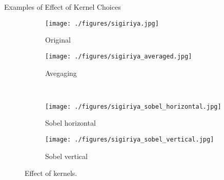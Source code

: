 \begin{frame}{Examples of Effect of Kernel Choices}
    \begin{figure}
        \centering
        \begin{subfigure}[b]{0.35\textwidth}
            \texttt{[image: ./figures/sigiriya.jpg]}
            \caption{Original}
            \label{sfi:sigiriya_original}
        \end{subfigure}
        \hspace{1cm}
        \begin{subfigure}[b]{0.35\textwidth}
            \texttt{[image: ./figures/sigiriya\_averaged.jpg]}
            \caption{Avegaging}
            \label{sfi:sigiriya_averaged}
        \end{subfigure}\\
        \centering
        \begin{subfigure}[b]{0.35\textwidth}
            \texttt{[image: ./figures/sigiriya\_sobel\_horizontal.jpg]}
            \caption{Sobel horizontal}
            \label{sfi:sigiriya_sobel_horizontal}
        \end{subfigure}
        \hspace{1cm}
        \begin{subfigure}[b]{0.35\textwidth}
            \texttt{[image: ./figures/sigiriya\_sobel\_vertical.jpg]}
            \caption{Sobel vertical}
            \label{sfi:sigiriya_averaged}
        \end{subfigure}
        \caption{Effect of kernels.}\label{fi:effect_of_kernels}
    \end{figure}
\end{frame}